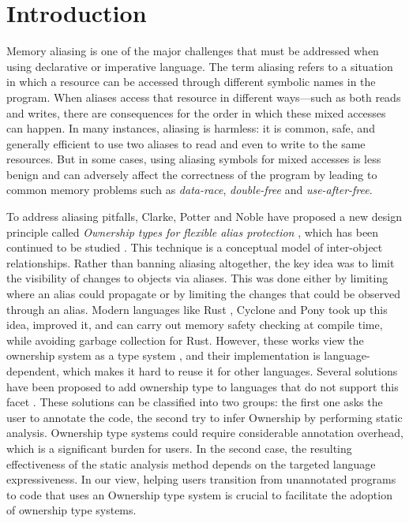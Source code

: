 \section{Introduction}

Memory aliasing is one of the major challenges that must be addressed when using declarative or imperative language. The term aliasing refers to a situation in which a resource can be accessed through different symbolic names in the program. When aliases access that resource in different ways—such as both reads and writes, there are consequences for the order in which these mixed accesses can happen. In many instances, aliasing is harmless: it is common, safe, and generally efficient to use two aliases to read and even to write to the same resources. But in some cases, using aliasing symbols for mixed accesses is less benign and can adversely affect the correctness of the program by leading to common memory problems such as \textit{data-race},  \textit{double-free} and  \textit{use-after-free}.

To address aliasing pitfalls, Clarke, Potter and Noble have proposed a new design principle called\textit{ Ownership types for flexible alias protection} \cite{10.1145/286942.286947}, which has been continued to be studied \cite{10.1007/978-3-642-36946-9_3}. This technique is a  conceptual model of inter-object relationships. Rather than banning aliasing altogether, the key idea was to limit the visibility of changes to objects via aliases. This was done either by limiting where an alias could propagate or by limiting the changes that could be observed through an alias. Modern languages like Rust \cite{matsakis2014rust}, Cyclone \cite{270632}  and Pony \cite{van2020strengthening} took up this idea, improved it, and can carry out memory safety checking at compile time, while avoiding garbage collection for Rust.
However, these works view the ownership system as a type system \cite{weiss2021oxide}, and their implementation is language-dependent, which makes it hard to reuse it for other languages.
Several solutions have been proposed to add ownership type to languages that do not support this facet \cite{10.1016/j.scico.2006.03.001, 10.1145/3453483.3454036}. These solutions can be classified into two groups: the first one asks the user to annotate the code, the second try to infer Ownership by performing static analysis. Ownership type systems could require considerable annotation overhead, which is a signiﬁcant burden for users. In the second case,
the resulting effectiveness of the static analysis method depends on the targeted language expressiveness. In our view, helping users transition from unannotated programs to code that uses an Ownership type system is crucial to facilitate the adoption of ownership type systems.\\

